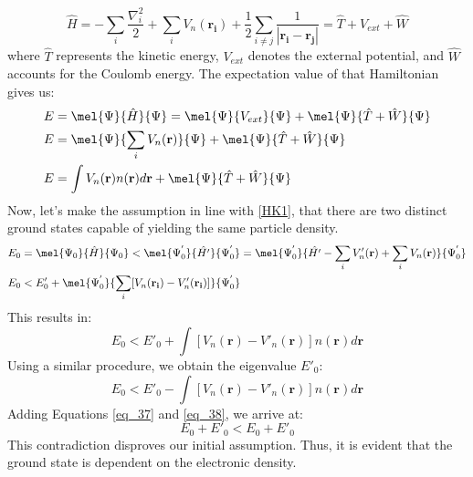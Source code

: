 \begin{equation} \label{eq_34}
\hat{H}=-\sum_{i}\dfrac{\nabla_{i}^{2}}{2} +\sum_{i}V_{n}(\mathbf{r_i})+\dfrac{1}{2}\sum_{i\neq j} \dfrac{1}{|\mathbf{r_i}-\mathbf{r_{j}}|}=\hat{T}+ V_{ext}+\hat{W}
\end{equation}
where $\hat{T}$ represents the kinetic energy, $V_{ext}$ denotes the external potential, and $\hat{W}$ accounts for the Coulomb energy. The expectation value of that Hamiltonian gives us:
\begin{equation} \label{eq_35}
\begin{aligned}
    E&= \mel{\Psi}{\hat{H}}{\Psi}=\mel{\Psi}{V_{ext}}{\Psi}+\mel{\Psi}{\hat{T}+\hat{W}}{\Psi} \\
    E&=\mel{\Psi}{\sum_{i}V_{n}(\mathbf{r})}{\Psi} +\mel{\Psi}{\hat{T}+\hat{W}}{\Psi} \\
    E&=\int V_n (\mathbf{r})n(\mathbf{r})d  \mathbf{r}+\mel{\Psi}{\hat{T}+\hat{W}}{\Psi}
\end{aligned}
\end{equation}
Now, let's make the assumption in line with  \ref{HK1}, that there are two distinct  ground states capable of yielding the same particle density.
\begin{equation} \label{eq_36}
\begin{aligned}
    E_0 &= \mel{\Psi_0}{\hat{H}}{\Psi_0}<\mel{\Psi_{0}^{'}}{\hat{H'}}{\Psi_{0}^{'}}=\mel{\Psi_{0}^{'}}{\hat{H'}-\sum_{i}V'_{n}(\mathbf{r})+\sum_{i}V_{n}(\mathbf{r})}{\Psi_{0}^{'}} \\
    E_0 &< E'_0 + \mel{\Psi_{0}^{'}}{\sum_{i}[V_{n}(\mathbf{r_i})-V'_n(\mathbf{r_i})]}{\Psi_{0}^{'}} \\
\end{aligned}    
\end{equation}
This results in:
\begin{equation} \label{eq_37}
	     E_0 < E'_0 + \int [V_{n}(\mathbf{r})-V'_n(\mathbf{r})] n(\mathbf{r})d \mathbf{r}
\end{equation}
Using a similar procedure, we obtain the eigenvalue $E'_0$:
\begin{equation} \label{eq_38}
	     E_0 < E'_0 - \int [V_{n}(\mathbf{r})-V'_n(\mathbf{r})] n(\mathbf{r})d \mathbf{r}
\end{equation}
Adding Equations \ref{eq_37} and \ref{eq_38}, we arrive at:
\begin{equation} \label{eq_39}
	E_0 + E'_0 < E_0 + E'_0 
\end{equation}
This contradiction disproves our initial assumption. Thus, it is evident that the ground state is dependent on the electronic density. 
